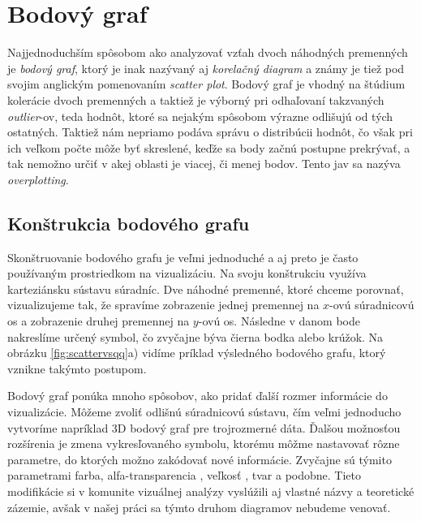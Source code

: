 \label{chap:prevvis}

\section{Bodový graf}
\label{sec:scatterplot}
Najjednoduchším spôsobom ako analyzovať vzťah dvoch náhodných premenných je \textit{bodový graf}, ktorý je inak nazývaný aj \textit{korelačný diagram} a známy je tiež pod svojim anglickým pomenovaním \textit{scatter plot}. Bodový graf je vhodný na štúdium kolerácie dvoch premenných a taktiež je výborný pri odhaľovaní takzvaných \mbox{\textit{outlier}-ov}, teda hodnôt, ktoré sa nejakým spôsobom výrazne odlišujú od tých ostatných. Taktiež nám nepriamo podáva správu o distribúcii hodnôt, čo však pri ich veľkom počte môže byť skreslené, keďže sa body začnú postupne prekrývať, a tak nemožno určiť v akej oblasti je viacej, či menej bodov. Tento jav sa nazýva \textit{overplotting}.


\subsection{Konštrukcia bodového grafu}
Skonštruovanie bodového grafu je veľmi jednoduché a aj preto je často používaným prostriedkom na vizualizáciu. Na svoju konštrukciu využíva karteziánsku sústavu súradníc. Dve náhodné premenné, ktoré chceme porovnať, vizualizujeme tak, že spravíme zobrazenie jednej premennej na \mbox{$ x $-ovú} súradnicovú os a zobrazenie druhej premennej na \mbox{$ y $-ovú} os. Následne v danom bode nakreslíme určený symbol, čo zvyčajne býva čierna bodka alebo krúžok. 
Na obrázku \ref{fig:scattervsqq}a) vidíme príklad výsledného bodového grafu, ktorý vznikne takýmto postupom.

Bodový graf ponúka mnoho spôsobov, ako pridať ďalší rozmer informácie do vizualizácie. Môžeme zvoliť odlišnú súradnicovú sústavu, čím veľmi jednoducho vytvoríme napríklad 3D bodový graf pre trojrozmerné dáta. Ďalšou možnosťou rozšírenia je zmena vykresľovaného symbolu, ktorému môžme nastavovať rôzne parametre, do ktorých možno zakódovať nové informácie. Zvyčajne sú týmito parametrami farba, \mbox{alfa-transparencia} \cite{SolutionToOverplotting}, veľkosť \cite{Viegas}, tvar \cite{GenSensScatterplot, EnhanceScatterplot} a podobne. Tieto modifikácie si v komunite vizuálnej analýzy vyslúžili aj vlastné názvy a teoretické zázemie, avšak v našej práci sa týmto druhom diagramov nebudeme venovať.

